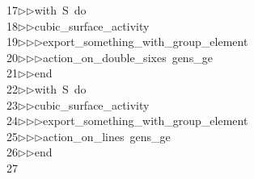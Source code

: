 \begin{tabbing}
17\>$\triangleright$\>$\triangleright$\>with\ S\ do\ \\[0pt]
18\>$\triangleright$\>$\triangleright$\>cubic\_surface\_activity\ \\[0pt]
19\>$\triangleright$\>$\triangleright$\>$\triangleright$\>export\_something\_with\_group\_element\ \\[0pt]
20\>$\triangleright$\>$\triangleright$\>$\triangleright$\>action\_on\_double\_sixes\ gens\_ge\ \\[0pt]
21\>$\triangleright$\>$\triangleright$\>end\ \\[0pt]
22\>$\triangleright$\>$\triangleright$\>with\ S\ do\ \\[0pt]
23\>$\triangleright$\>$\triangleright$\>cubic\_surface\_activity\ \\[0pt]
24\>$\triangleright$\>$\triangleright$\>$\triangleright$\>export\_something\_with\_group\_element\ \\[0pt]
25\>$\triangleright$\>$\triangleright$\>$\triangleright$\>action\_on\_lines\ gens\_ge\ \\[0pt]
26\>$\triangleright$\>$\triangleright$\>end\\[0pt]
27\>\end{tabbing}
